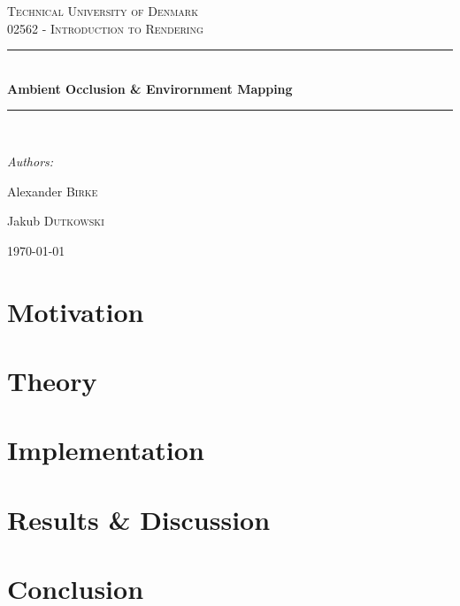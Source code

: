 \documentclass[12pt, twoside,a4paper]{report}
\newcommand{\HRule}{\rule{\linewidth}{0.5mm}}
\begin{document}






\begin{titlepage}
\begin{center}

\textsc{\LARGE Technical University of Denmark}\\[1.5cm]

\textsc{\Large 02562 - Introduction to Rendering}\\[0.5cm]
\HRule \\[0.4cm]
{ \huge \bfseries Ambient Occlusion \& Envirornment Mapping}\\[0.4cm]
\HRule \\[1.5cm]
\begin{center}
\emph{Authors:}\\
\end{center}
\begin{minipage}{0.4\textwidth}
\begin{flushleft} \large
Alexander \textsc{Birke}
\end{flushleft}
\end{minipage}
\begin{minipage}{0.4\textwidth}
\begin{flushright} \large
Jakub \textsc{Dutkowski}
\end{flushright}
\end{minipage}

\vfill

{\large \today}

\end{center}

\end{titlepage}

\tableofcontents
\chapter{Motivation}


\chapter{Theory}


\chapter{Implementation}


\chapter{Results \& Discussion}


\chapter{Conclusion}

 

%

\end{document}

